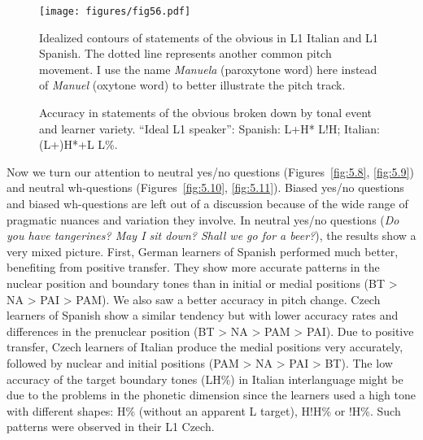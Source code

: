 \begin{figure}

\texttt{[image: figures/fig56.pdf]}
\caption{Idealized contours of statements of the obvious in L1 Italian and L1 Spanish. The dotted line represents another common pitch movement. I use the name \textit{Manuela} (paroxytone word) here instead of \textit{Manuel} (oxytone word) to better illustrate the pitch track.}
\label{fig:5.6}
\end{figure}

\begin{figure}




\caption{Accuracy in statements of the obvious broken down by tonal event and learner variety. ``Ideal L1 speaker'': Spanish: L+H* L!H; Italian: (L+)H*+L L\%.}
\label{fig:5.7}
\end{figure}


Now we turn our attention to neutral yes/no questions (Figures~\ref{fig:5.8}, \ref{fig:5.9}) and neutral wh-questions (Figures~\ref{fig:5.10}, \ref{fig:5.11}). Biased yes/no questions and biased wh-questions are left out of a discussion because of the wide range of pragmatic nuances and variation they involve. In neutral yes/no questions (\textit{Do you have tangerines? May I sit down? Shall we go for a beer?}), the results show a very mixed picture. First, German learners of Spanish performed much better, benefiting from positive transfer. They show more accurate patterns in the nuclear position and boundary tones than in initial or medial positions (BT > NA > PAI > PAM). We also saw a better accuracy in pitch change. Czech learners of Spanish show a similar tendency but with lower accuracy rates and differences in the prenuclear position (BT > NA > PAM > PAI). Due to positive transfer, Czech learners of Italian produce the medial positions very accurately, followed by nuclear and initial positions (PAM > NA > PAI > BT). The low accuracy of the target boundary tones (LH\%) in Italian interlanguage might be due to the problems in the phonetic dimension since the learners used a high tone with different shapes: H\% (without an apparent L target), H!H\% or !H\%. Such patterns were observed in their L1 Czech.


